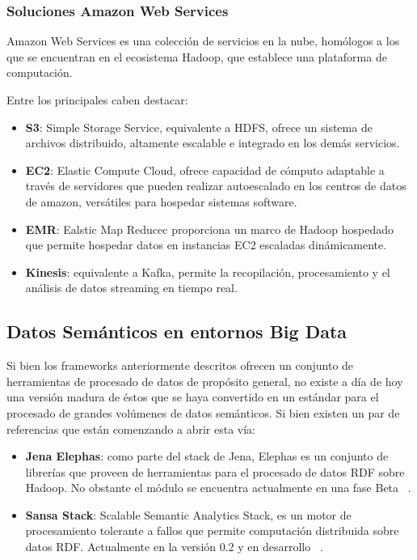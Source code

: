 \subsubsection{Soluciones Amazon Web Services}
\label{sec:eco-aws}

Amazon Web Services es una colección de servicios en la nube, homólogos a los
que se encuentran en el ecosistema Hadoop, que establece una plataforma de
computación.

Entre los principales caben destacar:

\begin{itemize}
\item \textbf{S3}: Simple Storage Service, equivalente a \acs{HDFS}, ofrece un sistema de archivos
  distribuido, altamente escalable e integrado en los demás servicios. 
\item \textbf{EC2}: Elastic Compute Cloud, ofrece capacidad de cómputo adaptable
  a través de servidores que pueden realizar autoescalado en los centros de
  datos de amazon, versátiles para hospedar sistemas software. 
\item \textbf{EMR}: Ealstic Map Reducec proporciona un marco de Hadoop hospedado que permite
  hospedar datos en instancias EC2 escaladas dinámicamente. 
\item \textbf{Kinesis}: equivalente a Kafka, permite la recopilación,
  procesamiento y el análisis de datos streaming en tiempo real. 
\end{itemize}


\subsection{Datos Semánticos en entornos Big Data}

Si bien los frameworks anteriormente descritos ofrecen un conjunto de
herramientas de procesado de datos de propósito general, no existe a día de hoy
una versión madura de éstos que se haya convertido en un estándar para el
procesado de grandes volúmenes de datos semánticos. Si bien existen un par de
referencias que están comenzando a abrir esta vía: 

\begin{itemize}
\item \textbf{Jena Elephas}: como parte del stack de Jena, Elephas es un
  conjunto de librerías que proveen de herramientas para el procesado de datos
  RDF sobre Hadoop. No obstante el módulo se encuentra actualmente en una fase
  Beta ~\cite{JENE:jena-elephas}. 
\item \textbf{Sansa Stack}: Scalable Semantic Analytics Stack, es un motor de
  procesamiento tolerante a fallos que permite computación distribuida sobre
  datos RDF. Actualmente en la versión 0.2 y en desarrollo ~\cite{SANSA-stack}.
\end{itemize}

